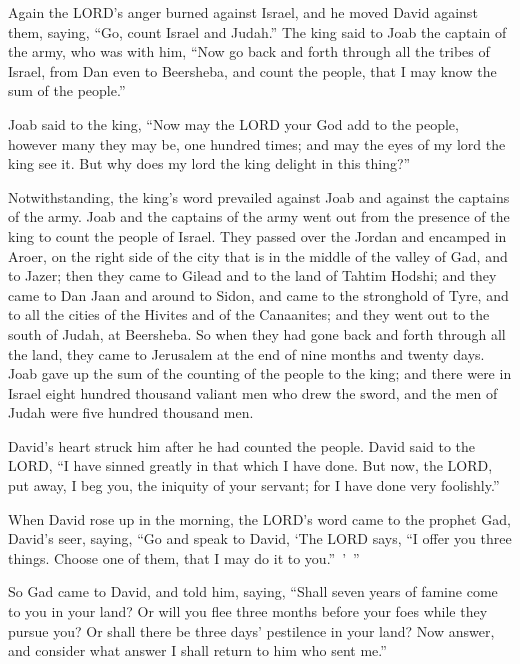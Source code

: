 \mychapter{} \myverse*{}Again the LORD’s anger burned against Israel, and he moved David
against them, saying, “Go, count Israel and Judah.”
\myverse{}The king said to Joab the captain of the army, who was with him, “Now go back
and forth through all the tribes of Israel, from Dan even to Beersheba, and count the people, that I may
know the sum of the people.”

\myverse{}Joab said to the king, “Now may the LORD your God add to the people,
however many they may be, one hundred times; and may the eyes of my lord the king see it. But why does
my lord the king delight in this thing?”

\myverse{}Notwithstanding, the king’s word prevailed against Joab and against
the captains of the army. Joab and the captains of the army went out from the presence of the king to
count the people of Israel.
\myverse{}They passed over the Jordan and encamped in Aroer, on the right side of the
city that is in the middle of the valley of Gad, and to Jazer;
\myverse{}then they came to Gilead and to the land of Tahtim Hodshi; and they came to
Dan Jaan and around to Sidon,
\myverse{}and came to the stronghold of Tyre, and to all the cities of the Hivites and
of the Canaanites; and they went out to the south of Judah, at Beersheba.
\myverse{}So when they had gone back and forth through all the land, they came to Jerusalem
at the end of nine months and twenty days.
\myverse{}Joab gave up the sum of the counting of the people to the king; and there were
in Israel eight hundred thousand valiant men who drew the sword, and the men of Judah were five hundred
thousand men.

\myverse{}David’s heart struck him after he had counted the people. David
said to the LORD, “I have sinned greatly in that which I have done. But now, the LORD, put away, I beg
you, the iniquity of your servant; for I have done very foolishly.”

\myverse{}When David rose up in the morning, the LORD’s word came to the
prophet Gad, David’s seer, saying,
\myverse{}“Go and speak to David, ‘The LORD says, “I offer you three things. Choose
one of them, that I may do it to you.” ’ ”

\myverse{}So Gad came to David, and told him, saying, “Shall seven years
of famine come to you in your land? Or will you flee three months before your foes while they pursue you?
Or shall there be three days’ pestilence in your land? Now answer, and consider what answer I shall return
to him who sent me.”

